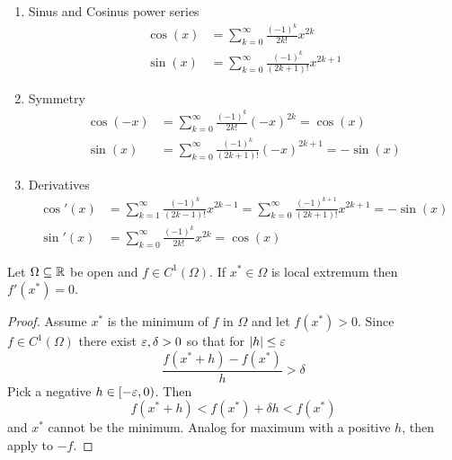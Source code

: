 \begin{lemma}\hfill
    \begin{enumerate}
        \item Sinus and Cosinus power series
              \[
                  \begin{split}
                      \cos(x) &= \sum_{k=0}^\infty \frac{{(-1)}^k}{2k!} x^{2k} \\
                      \sin(x) &= \sum_{k=0}^\infty \frac{{(-1)}^k}{(2k + 1)!} x^{2k + 1}
                  \end{split}
              \]
        \item Symmetry
              \[
                  \begin{split}
                      \cos(-x) &= \sum_{k=0}^\infty \frac{{(-1)}^k}{2k!} {(-x)}^{2k} = \cos(x) \\
                      \sin(x) &= \sum_{k=0}^\infty \frac{{(-1)}^k}{(2k + 1)!} {(-x)}^{2k + 1} = -\sin(x)
                  \end{split}
              \]
        \item Derivatives
              \[
                  \begin{split}
                      \cos'(x) &= \sum_{k=1}^\infty \frac{{(-1)}^k}{(2k - 1)!} x^{2k - 1}
                      = \sum_{k=0}^\infty \frac{{(-1)}^{k + 1}}{(2k + 1)!} x^{2k + 1} = -\sin(x) \\
                      \sin'(x) &= \sum_{k=0}^\infty \frac{{(-1)}^k}{2k!} {x}^{2k} = \cos(x)
                  \end{split}
              \]
    \end{enumerate}
\end{lemma}
\bigskip


\begin{theorem}\label{thm:fermat_stationary_point}
    Let \( \Omega \subseteq \mathbb{R} \) be open and \( f \in C^1(\Omega) \). If \( x^* \in \Omega \) is local extremum
    then \( f'(x^*) = 0 \).
\end{theorem}

\begin{proof}
    Assume \( x^* \) is the minimum of \( f \) in \( \Omega \) and let \( f(x^*) > 0 \).
    Since \( f \in C^1(\Omega) \) there exist \( \varepsilon, \delta > 0 \) so that for \( |h| \le \varepsilon \)
    \[
        \frac{f(x^* + h) - f(x^*)}{h} > \delta
    \]
    Pick a negative \( h \in [-\varepsilon, 0) \). Then   %
    \[
        f(x^* + h) < f(x^*) +  \delta h < f(x^*)
    \]
    and \( x^* \) cannot be the minimum. Analog for maximum with a positive \( h \), then apply to \( -f \).
\end{proof}
\bigskip


